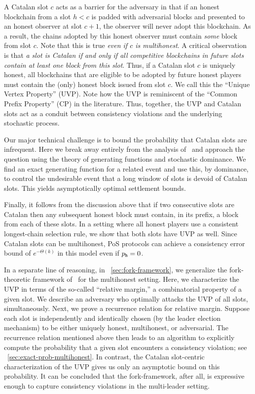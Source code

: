 A Catalan slot $c$ acts as a barrier for the adversary in that if an
honest blockchain from a slot $h < c$ is padded with adversarial
blocks and presented to an honest observer at slot $c + 1$, the
observer will never adopt this blockchain.  As a result, the chains
adopted by this honest observer must contain \emph{some} block from
slot $c$.  Note that this is true \emph{even if $c$ is
  multihonest}.  A critical observation is that \emph{a slot is
  Catalan if and only if all competitive blockchains in future slots
  contain at least one block from this slot}.  Thus, if a Catalan slot
$c$ is uniquely honest, all blockchains that are eligible to be
adopted by future honest players must contain the (only) honest block
issued from slot $c$.  We call this the ``Unique Vertex Property''
(UVP).  Note how the UVP is reminiscent of the ``Common Prefix
Property'' (CP) in the literature. Thus, together, the UVP and 
Catalan slots act as a conduit between consistency
violations and the underlying stochastic process. 

Our major technical challenge is to bound the probability that Catalan
slots are infrequent. Here we break away entirely from the analysis
of~\cite{SnowWhite} and approach the question using the theory of
generating functions and stochastic dominance. We find an exact
generating function for a related event and use this, by dominance, to
control the undesirable event that a long window of slots is devoid of
Catalan slots. This yields
asymptotically optimal settlement bounds.

Finally, it follows from the discussion above that if two consecutive
slots are Catalan then any subsequent honest block must contain, in
its prefix, a block from each of these slots.  In a setting where all
honest players use a consistent longest-chain selection rule,
we show that both slots have UVP as well.  Since Catalan slots can be
multihonest, PoS protocols can achieve a consistency error bound
of $e^{-\Theta(k)}$ in this model even if $p_{\mathtt{h}} = 0$.

In a separate line of reasoning, in \Section~\ref{sec:fork-framework}, 
we generalize the fork-theoretic framework of~\citet{LinearConsistency} for the multihonest setting. 
Here, we characterize the UVP 
in terms of the so-called ``relative margin,'' 
a combinatorial property of a given slot. 
We describe an adversary who optimally attacks the UVP 
of all slots, simultaneously. 
Next, we prove a recurrence relation for relative margin. 
Suppose each slot is 
independently and identically chosen 
(by the leader election mechanism) 
to be either uniquely honest, multihonest, or adversarial. 
The recurrence relation mentioned above then 
leads to an algorithm to explicitly compute 
the probability that 
a given slot encounters a consistency violation; 
see \Section~\ref{sec:exact-prob-multihonest}. 
In contrast, the Catalan slot-centric characterization of the UVP 
gives us only an asymptotic bound on this probability. 
It can be concluded that the fork-framework, after all, 
is expressive enough to capture consistency violations 
in the multi-leader setting.


